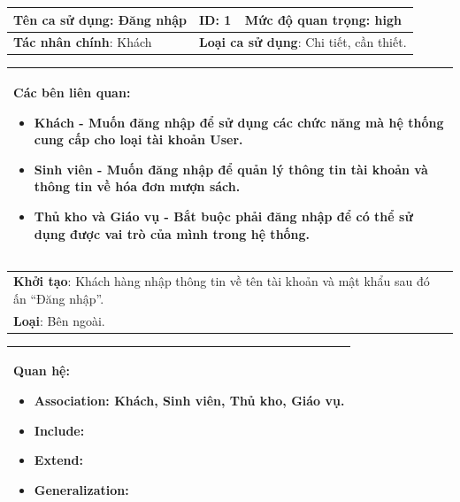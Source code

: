 \documentclass[../report.tex]{subfiles}
\begin{document}
\begin{center}

\newpage
\begin{tabular}{| m{6cm} | m{3cm} | m{6cm} |}
    \hline
    \textbf{Tên ca sử dụng}: Đăng nhập & \textbf{ID}: 1 & \textbf{Mức độ quan trọng}: high \\
    \hline
    \textbf{Tác nhân chính}: Khách & \multicolumn{2}{|l|}{\textbf{Loại ca sử dụng}: Chi tiết, cần thiết.} \\
    \hline
\end{tabular}
\begin{tabular}{| m{15.9cm} |}
    \hline
        \textbf{Các bên liên quan:} 
        \begin{itemize}
            \item Khách - Muốn đăng nhập để sử dụng các chức năng mà hệ thống cung cấp cho loại tài khoản User. 
            \item Sinh viên - Muốn đăng nhập để quản lý thông tin tài khoản và thông tin về hóa đơn mượn sách. 
            \item Thủ kho và Giáo vụ - Bắt buộc phải đăng nhập để có thể sử dụng được vai trò của mình trong hệ thống. 
        \end{itemize} \\
    \hline
\end{tabular}

\begin{tabular}{| m{15.9cm} |}
    \hline
    \textbf{Khởi tạo}: Khách hàng nhập thông tin về tên tài khoản và mật khẩu sau đó ấn ``Đăng nhập''. \\
    \textbf{Loại}: Bên ngoài.  \\
    \hline
\end{tabular}

\begin{tabular}{| m{15.9cm} |}
    \hline
    \textbf{Quan hệ}:
    \begin{itemize}
        \item Association: Khách, Sinh viên, Thủ kho, Giáo vụ. 
        \item Include: 
        \item Extend: 
        \item Generalization: 
    \end{itemize} \\
    \hline
\end{tabular}


\end{center}
\end{document}
